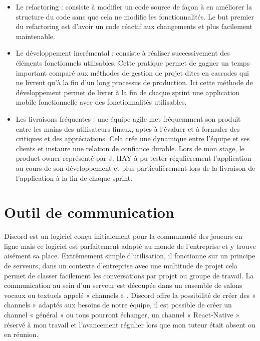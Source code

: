 \begin{itemize}
    \item Le refactoring : consiste à modifier un code source de façon à en améliorer la structure du code sans que cela ne modifie les fonctionnalités. Le but premier du refactoring est d’avoir un code réactif aux changements et plus facilement maintenable. 
    
    \item  Le développement incrémental : consiste à réaliser successivement des éléments fonctionnels utilisables. Cette pratique permet de gagner un temps important comparé aux méthodes de gestion de projet dites en cascades qui ne livrent qu’à la fin d’un long processus de production. Ici cette méthode de développement permet de livrer à la fin de chaque sprint une application mobile fonctionnelle avec des fonctionnalités utilisables. 
    
    \item Les livraisons fréquentes : une équipe agile met fréquemment son produit entre les mains des utilisateurs finaux, aptes à l’évaluer et à formuler des critiques et des appréciations. Cela crée une dynamique entre l’équipe et ses clients et instaure une relation de confiance durable. Lors de mon stage, le product owner représenté par J. HAY à pu tester régulièrement l’application au cours de son développement et plus particulièrement lors de la livraison de l’application à la fin de chaque sprint.
\end{itemize}


\section{Outil de communication}
 
Discord est un logiciel conçu initialement pour la communauté des joueurs en ligne mais ce logiciel est parfaitement adapté au monde de l'entreprise et y trouve aisément sa place. Extrêmement simple d’utilisation, il fonctionne sur un principe de serveurs, dans un contexte d'entreprise avec une multitude de projet cela permet de classer facilement les conversations par projet ou groupe de travail. La communication au sein d'un serveur est découpée dans un ensemble de salons vocaux ou textuels appelé « channels » . Discord offre la possibilité de créer des « channels » adaptés aux besoins de notre équipe, il est possible de créer un channel « général » ou tous pourront échanger, un channel « React-Native » réservé à mon travail et l'avancement régulier lors que mon tuteur était absent ou en réunion. 

